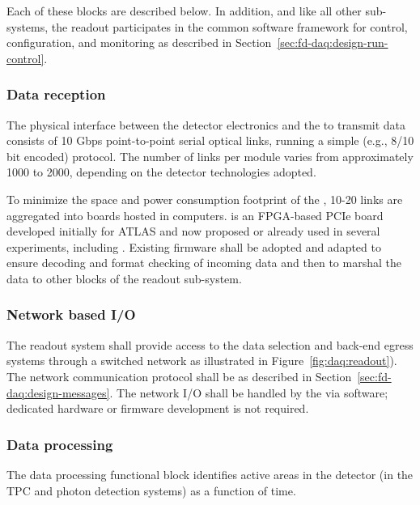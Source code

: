 Each of these blocks are described below.  In addition, and like all other  sub-systems, the readout participates in the common software framework for control, configuration, and monitoring as described in Section~\ref{sec:fd-daq:design-run-control}.

\subsubsection{Data reception}

The physical interface between the detector electronics and the  to transmit data consists of 10 Gbps point-to-point serial optical links, running a simple (e.g., 8/10 bit encoded) protocol. 
The number of links per  module varies from approximately 1000 to 2000, depending on the detector technologies adopted.

To minimize the space and power consumption footprint of the , 10-20 links are aggregated into  boards hosted in  computers. 
 is an FPGA-based PCIe board developed initially for ATLAS and now proposed or already used in several experiments, including . 
Existing firmware shall be adopted and adapted to ensure decoding and format checking of incoming data and then to marshal the data to other blocks of the readout sub-system.

\subsubsection{Network based I/O}

The readout system shall provide access to the data selection and back-end egress systems through a  switched network as illustrated in Figure~\ref{fig:daq:readout}).
The network communication protocol shall be as described in Section~\ref{sec:fd-daq:design-messages}.
The network I/O shall be handled by the  via software; dedicated hardware or firmware development is not required.

\subsubsection{Data processing}

The data processing functional block identifies active areas in the detector (in the TPC and photon detection systems) as a function of time.

